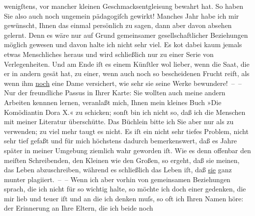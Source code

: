 \begin{ledgroupsized}[t]{13cm}
               wenigſtens, vor mancher kleinen Geschmacksentgleisung bewahrt hat. So haben Sie also
               auch noch ungemein pädagogiſch gewirkt!\pend
           \pstart
           {\pb}Manches Jahr habe ich mir gewünscht, Ihnen das einmal
               persönlich zu sagen, dann aber davon absehen gelernt. Denn es wäre nur auf Grund
               gemeinsamer gesellschaftlicher Beziehungen möglich gewesen und davon halte ich nicht
               sehr viel. Es ko{\geminationm}t dabei kaum jemals etwas Menschliches
               heraus und wird schließlich nur zu einer Serie von Verlegenheiten. Und am Ende iſt es
               einem Künſtler wol lieber, wenn die Saat, die er in andern gesät hat, zu einer, wenn
               auch noch so bescheidenen Frucht reift, als wenn ihm \uline{noch} eine Dame versichert, wie sehr sie seine Werke bewundere! – –\pend
           \pstart
           Nur der freundliche Passus in Ihrer Karte: Sie wollten auch meine andern Arbeiten
               kennnen lernen, veranlaßt mich, Ihnen mein kleines Buch »Die Komödiantin Dora X.« zu schicken; sonſt bin ich nicht so,
               daß ich die Menschen mit meiner Literatur überschütte. Das Büchlein bitte ich Sie\strikeout{,} aber nur als \label{K_L02572-2v}\label{K_L02572-2h} zu verwenden; zu viel mehr taugt es nicht. Es iſt ein nicht sehr tiefes
               Problem, nicht sehr tief gefaßt und für mich höchstens dadurch bemerkenswert, daß es
               Jahre später in meiner Umgebung ziemlich wahr geworden iſt. Wie es denn offenbar den
               meiſten Schreibenden, den Kleinen wie den Großen, so ergeht, {\pb}daß sie meinen, das Leben abzuschreiben, während es schließlich das Leben iſt, daß
                  \uline{sie} ganz munter plagiiert. – –\pend
           \pstart
           Wenn ich aber vorhin von gemeinsamen Beziehungen sprach, die ich nicht für so wichtig
               halte, so möchte ich doch einer gedenken, die mir lieb und teuer iſt und an die ich
               denken muſs, so oft ich Ihren Namen höre: der Erinnerung an Ihre Eltern, die ich beide noch

\end{ledgroupsized}
